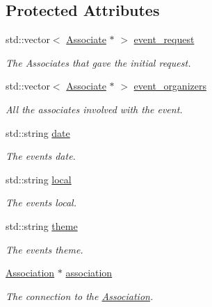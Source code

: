 \subsection*{Protected Attributes}
\begin{DoxyCompactItemize}
\item 
std\+::vector$<$ \hyperlink{classAssociate}{Associate} $\ast$ $>$ \hyperlink{classEvent_a6cec387dca85f0a0e8419cfc94eb320e}{event\+\_\+request}
\begin{DoxyCompactList}\small\item\em The Associates that gave the initial request. \end{DoxyCompactList}\item 
std\+::vector$<$ \hyperlink{classAssociate}{Associate} $\ast$ $>$ \hyperlink{classEvent_ad35e04c759fdbfad75aed0b6e2eef63c}{event\+\_\+organizers}
\begin{DoxyCompactList}\small\item\em All the associates involved with the event. \end{DoxyCompactList}\item 
std\+::string \hyperlink{classEvent_a9a93c9d38211f84cd6e347690e177f11}{date}
\begin{DoxyCompactList}\small\item\em The event\textquotesingle{}s date. \end{DoxyCompactList}\item 
std\+::string \hyperlink{classEvent_a3d1f28a3bde9ab718d5b0003f8ab5129}{local}
\begin{DoxyCompactList}\small\item\em The event\textquotesingle{}s local. \end{DoxyCompactList}\item 
std\+::string \hyperlink{classEvent_aa9cc4378d5cecaadc8e6de92b313e6f8}{theme}
\begin{DoxyCompactList}\small\item\em The event\textquotesingle{}s theme. \end{DoxyCompactList}\item 
\hyperlink{classAssociation}{Association} $\ast$ \hyperlink{classEvent_a3c8694833e50dbd2e37943eff1f5c9b1}{association}
\begin{DoxyCompactList}\small\item\em The connection to the \hyperlink{classAssociation}{Association}. \end{DoxyCompactList}\end{DoxyCompactItemize}


